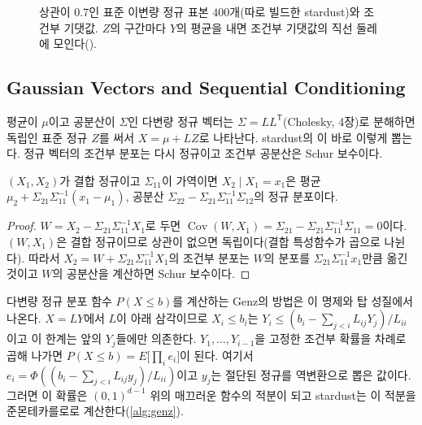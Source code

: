 \begin{figure}[htbp]
\centering
{}
\caption{상관이 $0.7$인 표준 이변량 정규 표본 $400$개(따로 빌드한 stardust)와 조건부 기댓값. $Z$의 구간마다 $Y$의 평균을 내면 조건부 기댓값의 직선 둘레에 모인다().}
\label{fig:condexp}
\end{figure}

\subsection{Gaussian Vectors and Sequential Conditioning}

평균이 $\mu$이고 공분산이 $\Sigma$인 다변량 정규 벡터는 $\Sigma=LL^{\mathsf T}$(Cholesky, 4장)로 분해하면 독립인 표준 정규 $Z$를 써서 $X=\mu+LZ$로 나타난다. stardust의 이 바로 이렇게 뽑는다. 정규 벡터의 조건부 분포는 다시 정규이고 조건부 공분산은 Schur 보수이다.

\begin{proposition}
\label{prop:gaussian-conditional}
$(X_1,X_2)$가 결합 정규이고 $\Sigma_{11}$이 가역이면 $X_2\mid X_1=x_1$은 평균 $\mu_2+\Sigma_{21}\Sigma_{11}^{-1}(x_1-\mu_1)$, 공분산 $\Sigma_{22}-\Sigma_{21}\Sigma_{11}^{-1}\Sigma_{12}$의 정규 분포이다.
\end{proposition}

\begin{proof}
$W=X_2-\Sigma_{21}\Sigma_{11}^{-1}X_1$로 두면 $\operatorname{Cov}(W,X_1)=\Sigma_{21}-\Sigma_{21}\Sigma_{11}^{-1}\Sigma_{11}=0$이다. $(W,X_1)$은 결합 정규이므로 상관이 없으면 독립이다(결합 특성함수가 곱으로 나뉜다). 따라서 $X_2=W+\Sigma_{21}\Sigma_{11}^{-1}X_1$의 조건부 분포는 $W$의 분포를 $\Sigma_{21}\Sigma_{11}^{-1}x_1$만큼 옮긴 것이고 $W$의 공분산을 계산하면 Schur 보수이다.
\end{proof}

다변량 정규 분포 함수 $P(X\le b)$를 계산하는 Genz의 방법\cite{genz1992}은 이 명제와 탑 성질에서 나온다. $X=LY$에서 $L$이 아래 삼각이므로 $X_i\le b_i$는 $Y_i\le(b_i-\sum_{j<i}L_{ij}Y_j)/L_{ii}$이고 이 한계는 앞의 $Y_j$들에만 의존한다. $Y_1,\dots,Y_{i-1}$을 고정한 조건부 확률을 차례로 곱해 나가면 $P(X\le b)=E\bigl[\prod_ie_i\bigr]$이 된다. 여기서 $e_i=\Phi((b_i-\sum_{j<i}L_{ij}y_j)/L_{ii})$이고 $y_j$는 절단된 정규를 역변환으로 뽑은 값이다. 그러면 이 확률은 $(0,1)^{d-1}$ 위의 매끄러운 함수의 적분이 되고 stardust는 이 적분을 준몬테카를로로 계산한다(\cref{alg:genz}).

